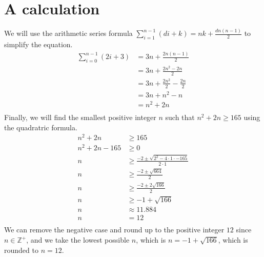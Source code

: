\documentclass[12pt]{article}
\begin{document}
\newpage
\section*{A calculation}

We will use the arithmetic series formula $\sum_{i=1}^{n-1} (di + k) = 
nk + \frac{dn (n-1)}{2}$ to simplify the equation. 
\begin{align*}
    \sum_{i=0}^{n-1} (2i + 3) &= 3n + \frac{2n(n-1)}{2} \\
                              &= 3n + \frac{2n^2 - 2n}{2} \\
                              &= 3n + \frac{2n^2}{2} - \frac{2n}{2} \\
                              &= 3n + n^2 - n  \\
                              &= n^2 + 2n \\ 
\end{align*}
Finally, we will find the smallest positive integer $n$ such that 
$n^2 + 2n \geq 165$ using the quadratric formula. 
\begin{align*}
    n^2 + 2n &\geq 165 \\
    n^2 + 2n - 165 &\geq 0 \\
    n &\geq \frac{-2 \pm \sqrt{2^2 - 4 \cdot 1 \cdot -165}}{2 \cdot 1} \\
    n &\geq \frac{-2 \pm \sqrt{664}}{2} \\
    n &\geq \frac{-2 \pm 2\sqrt{166}}{2} \\
    n &\geq {-1 + \sqrt{166}} \\
    n &\approx 11.884\\
    n &= 12 \\
\end{align*}
We can remove the negative case and round up to the positive integer 
$12$ since $n \in \mathbb{Z}^+$, and we take the lowest possible $n$, 
which is $n = {-1 + \sqrt{166}}$, which is rounded to $n = 12$. 
\end{document}
